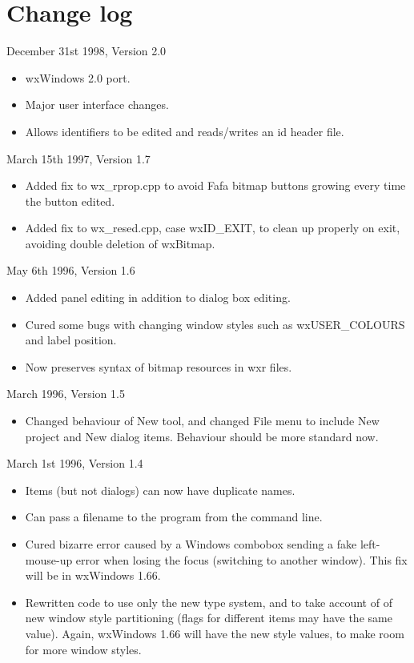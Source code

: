 \chapter{Change log}\label{changes}
%
\setfooter{\thepage}{}{}{}{}{\thepage}%

December 31st 1998, Version 2.0

\begin{itemize}\itemsep=0pt
\item wxWindows 2.0 port.
\item Major user interface changes.
\item Allows identifiers to be edited and reads/writes an id header file.
\end{itemize}

March 15th 1997, Version 1.7

\begin{itemize}\itemsep=0pt
\item Added fix to wx\_rprop.cpp to avoid Fafa bitmap buttons growing every time the
button edited.
\item Added fix to wx\_resed.cpp, case wxID\_EXIT, to clean up properly on exit, avoiding double deletion of wxBitmap.
\end{itemize}

May 6th 1996, Version 1.6

\begin{itemize}\itemsep=0pt
\item Added panel editing in addition to dialog box editing.
\item Cured some bugs with changing window styles such as wxUSER\_COLOURS and label position.
\item Now preserves syntax of bitmap resources in wxr files.
\end{itemize}

March 1996, Version 1.5

\begin{itemize}\itemsep=0pt
\item Changed behaviour of New tool, and changed File menu to include New project and New dialog items.
Behaviour should be more standard now.
\end{itemize}

March 1st 1996, Version 1.4

\begin{itemize}\itemsep=0pt
\item Items (but not dialogs) can now have duplicate names.
\item Can pass a filename to the program from the command line.
\item Cured bizarre error caused by a Windows combobox sending
a fake left-mouse-up error when losing the focus (switching to another
window). This fix will be in wxWindows 1.66.
\item Rewritten code to use only the new type system, and to take account of
of new window style partitioning (flags for different items may have the same value).
Again, wxWindows 1.66 will have the new style values, to make room for more window
styles.
\end{itemize}

